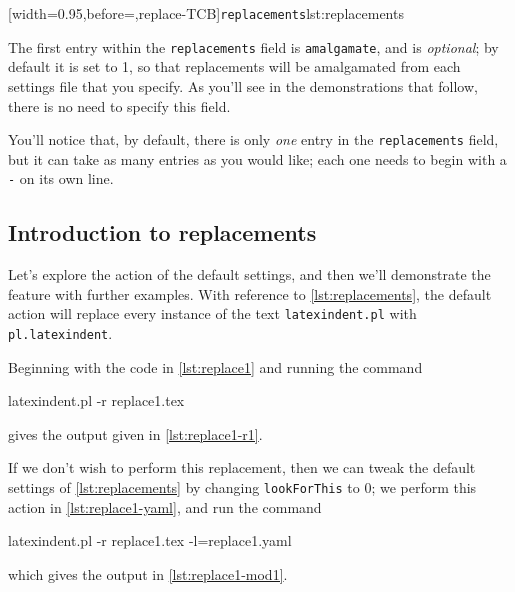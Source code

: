  [width=0.95\linewidth,before=\centering,replace-TCB]{\texttt{replacements}}{lst:replacements}

 The first entry within the \texttt{replacements} field is \texttt{amalgamate}, and is
 \emph{optional}; by default it is set to 1, so that replacements will be amalgamated from
 each settings file that you specify. As you'll see in the demonstrations that follow,
 there is no need to specify this field.

 You'll notice that, by default, there is only \emph{one} entry in the
 \texttt{replacements} field, but it can take as many entries as you would like; each one
 needs to begin with a \texttt{-} on its own line.

\subsection{Introduction to replacements}
 Let's explore the action of the default settings, and then we'll demonstrate the feature
 with further examples. With reference to \cref{lst:replacements}, the default action will
 replace every instance of the text \texttt{latexindent.pl} with \texttt{pl.latexindent}.

 Beginning with the code in \cref{lst:replace1} and running the command 
 \begin{commandshell}
latexindent.pl -r replace1.tex
\end{commandshell}
 gives the output given in \cref{lst:replace1-r1}.

 \begin{cmhtcbraster}[raster column skip=.01\linewidth]
 \end{cmhtcbraster}

 If we don't wish to perform this replacement, then we can tweak the default settings of
 \vref{lst:replacements} by changing \texttt{lookForThis} to 0; we perform this action in
 \cref{lst:replace1-yaml}, and run the command 
 \begin{commandshell}
latexindent.pl -r replace1.tex -l=replace1.yaml
\end{commandshell}
 which gives the output in \cref{lst:replace1-mod1}.


